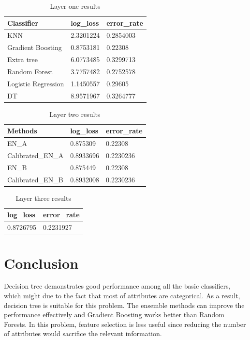 \documentclass{sig-alternate-05-2015}
\begin{document}
\begin{table}[ht]
\centering
\caption{Layer one results}
\label{layer1}
\begin{tabular}{|l|l|l|}
\hline
Classifier          & log\_loss & error\_rate \\ \hline
KNN                 & 2.3201224 & 0.2854003   \\ \hline
Gradient Boosting   & 0.8753181 & 0.22308     \\ \hline
Extra tree          & 6.0773485 & 0.3299713   \\ \hline
Random Forest       & 3.7757482 & 0.2752578   \\ \hline
Logistic Regression & 1.1450557 & 0.29605     \\ \hline
DT                  & 8.9571967 & 0.3264777   \\ \hline
\end{tabular}
\end{table}

\begin{table}[ht]
\centering
\caption{Layer two results}
\label{layer2}
\begin{tabular}{|l|l|l|}
\hline
Methods           & log\_loss & error\_rate \\ \hline
EN\_A             & 0.875309  & 0.22308     \\ \hline
Calibrated\_EN\_A & 0.8933696 & 0.2230236   \\ \hline
EN\_B             & 0.875449  & 0.22308     \\ \hline
Calibrated\_EN\_B & 0.8932008 & 0.2230236   \\ \hline
\end{tabular}
\end{table}

\begin{table}[ht]
\centering
\caption{Layer three results}
\label{layer3}
\begin{tabular}{|l|l|}
\hline
log\_loss & error\_rate \\ \hline
0.8726795 & 0.2231927   \\ \hline
\end{tabular}
\end{table}

\FloatBarrier
\section{Conclusion}

Decision tree demonstrates good performance among all the basic classifiers, which might due to the fact that most of attributes are categorical. As a result, decision tree is suitable for this problem. The ensemble methods can improve the performance effectively and Gradient Boosting works better than Random Forests. In this problem, feature selection is less useful since reducing the number of attributes would sacrifice the relevant information. 
\end{document}
